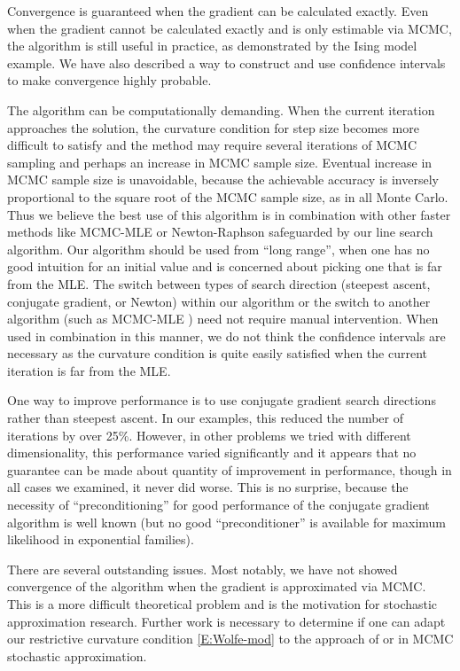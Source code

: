 \documentclass[oneside]{myumnStatThesis}
\begin{document}
Convergence is guaranteed when the gradient can be calculated exactly.  Even when the gradient cannot be calculated 
exactly and is only estimable via MCMC, the algorithm is still useful in practice, as demonstrated by the Ising model 
example.  We have also described a way to construct and use confidence intervals to make convergence highly probable.

The algorithm can be computationally demanding.  When the current iteration approaches the solution, the 
curvature condition for step size becomes more difficult to satisfy and the method may require several iterations of 
MCMC sampling and perhaps an increase in MCMC sample size.  Eventual increase in MCMC sample size is unavoidable,
because the achievable accuracy is inversely proportional to the square root of the MCMC sample size, as in all Monte Carlo.
Thus we believe the best use of this algorithm is in combination with other faster methods like MCMC-MLE \citep{Geyer:1992}
or Newton-Raphson safeguarded by our line search algorithm.  Our 
algorithm should be used from ``long range'', when one has no good intuition for an initial value and is concerned about 
picking one that is far from the MLE.  The switch between types of search direction (steepest ascent, conjugate gradient,
or Newton) within our algorithm or the switch to another algorithm (such as MCMC-MLE \citep{Geyer:1992})
need not require manual intervention.  When used in combination in this
manner, we do not think the confidence intervals are necessary as the curvature condition is quite easily satisfied 
when the current iteration is far from the MLE.

One way to improve performance is to use conjugate gradient search directions rather than steepest ascent.  In our 
examples, this reduced the number of iterations by over 25\%.  However, in other problems we tried with different 
dimensionality, this performance varied significantly and it appears that no guarantee can be made about quantity of 
improvement in performance, though in all cases we examined, it never did worse.  This is no surprise, because the
necessity of ``preconditioning'' for good performance of the conjugate gradient algorithm is well known (but no
good ``preconditioner'' is available for maximum likelihood in exponential families).

There are several outstanding issues.  Most notably, we have not showed convergence of the algorithm when the gradient 
is approximated via MCMC.  This is a more difficult theoretical problem and is the motivation for stochastic 
approximation research.  
Further work is necessary to determine if one can adapt our restrictive curvature condition \eqref{E:Wolfe-mod} to the 
approach of \citet{Andrieu:2005} or \citet{Liang:2010} in MCMC stochastic approximation.  
\end{document}
